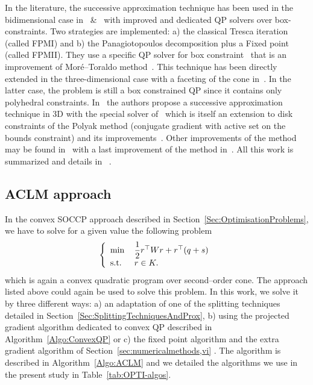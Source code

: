 In the literature, the successive approximation technique has been used in the bidimensional case in~\citep{Haslinger.ea_CMAME2002} \&~\citep{Dostal_JCAM2002} with improved and dedicated QP solvers over box-constraints. Two strategies are implemented: a) the classical Tresca iteration (called FPMI) and  b) the Panagiotopoulos decomposition plus a Fixed point (called FPMII). They use  a specific QP solver for box constraint~\cite{Dostal_SIOPT1997} that is an improvement of Mor\'e--Toraldo method~\citep{More.Toraldo1991}. This technique has been directly extended in the three-dimensional case with a faceting of the cone in~\cite{Haslinger.ea_JCAM2004}. In the latter case, the problem is still a  box constrained QP since it contains only polyhedral constraints. In~\cite{Haslinger.ea_MCS2012} the authors propose a successive approximation technique in 3D with the special solver of~\cite{Kucera_OMS2007,Kucera_SIOPT2008} which is itself an extension to disk constraints of the Polyak method (conjugate gradient with active set on the bounds constraint) and its improvements~\cite{Dostal_SIOPT1997,Dostal.Schoberl_COA2005}. Other improvements of the method may be found in~\cite{Dostal.Kucera_SIOPT2010} with a last improvement of the method in~\cite{Dostal.Kozubek_MP2012}. All this work is summarized and details in ~\cite{Dostal.ea_AMM2016}.


\subsection{ACLM approach}

In the convex SOCCP approach described in Section~\ref{Sec:OptimisationProblems}, we have to solve for a given value the following problem
\begin{equation}\label{eq:ACLM-4}
  \left\{
    \begin{array}{ll}
      \min\,&\Frac 1 2 r^\top W r + r^\top (q + s)  \\
      \text{s.t. } & r \in K.
    \end{array}
  \right.
\end{equation}
which is again a convex quadratic program over second--order cone. The approach listed above could again be used to solve this problem. In this work, we solve it by three different ways: a) an adaptation of one of the splitting techniques detailed in Section~\ref{Sec:SplittingTechniquesAndProx}, b) using the projected gradient algorithm dedicated to convex QP described in Algorithm~\ref{Algo:ConvexQP} or c) the fixed point algorithm and the extra gradient algorithm of Section~\ref{sec:numericalmethods,vi} . The algorithm is described in Algorithm~\ref{Algo:ACLM} and we detailed the algorithms we use in the present study in Table~\ref{tab:OPTI-algos}.

